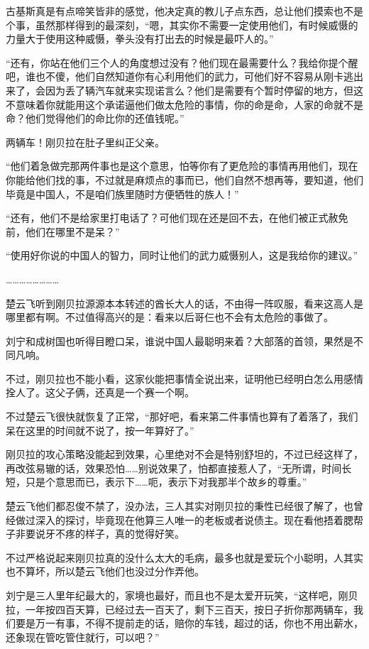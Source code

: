古基斯真是有点啼笑皆非的感觉，他决定真的教儿子点东西，总让他们摸索也不是个事，虽然那样得到的最深刻，“嗯，其实你不需要一定使用他们，有时候威慑的力量大于使用这种威慑，拳头没有打出去的时候是最吓人的。”

“还有，你站在他们三个人的角度想过没有？他们现在最需要什么？我给你提个醒吧，谁也不傻，他们自然知道你有心利用他们的武力，可他们好不容易从刚卡逃出来了，会因为丢了辆汽车就来实现诺言么？他们是需要有个暂时停留的地方，但这不意味着你就能用这个承诺逼他们做太危险的事情，你的命是命，人家的命就不是命？他们觉得他们的命比你的还值钱呢。”

两辆车！刚贝拉在肚子里纠正父亲。

“他们着急做完那两件事也是这个意思，怕等你有了更危险的事情再用他们，现在你能给他们找的事，不过就是麻烦点的事而已，他们自然不想再等，要知道，他们毕竟是中国人，不是咱们族里随时方便牺牲的族人！”

“还有，他们不是给家里打电话了？可他们现在还是回不去，在他们被正式赦免前，他们在哪里不是呆？”

“使用好你说的中国人的智力，同时让他们的武力威慑别人，这是我给你的建议。”

……………………

楚云飞听到刚贝拉源源本本转述的酋长大人的话，不由得一阵叹服，看来这高人是哪里都有啊。不过值得高兴的是：看来以后哥仨也不会有太危险的事做了。

刘宁和成树国也听得目瞪口呆，谁说中国人最聪明来着？大部落的首领，果然是不同凡响。

不过，刚贝拉也不能小看，这家伙能把事情全说出来，证明他已经明白怎么用感情拴人了。这父子俩，还真是一个赛一个啊。

不过楚云飞很快就恢复了正常，“那好吧，看来第二件事情也算有了着落了，我们呆在这里的时间就不说了，按一年算好了。”

刚贝拉的攻心策略没能起到效果，心里绝对不会是特别舒坦的，不过已经这样了，再改弦易辙的话，效果恐怕……别说效果了，怕都直接惹人了，“无所谓，时间长短，只是个意思而已，表示下……呃，表示下对我那半个故乡的尊重。”

楚云飞他们都忍俊不禁了，没办法，三人其实对刚贝拉的秉性已经很了解了，也曾经做过深入的探讨，毕竟现在他算三人唯一的老板或者说债主。现在看他捂着腮帮子非要说牙不疼的样子，真的觉得好笑。

不过严格说起来刚贝拉真的没什么太大的毛病，最多也就是爱玩个小聪明，人其实也不算坏，所以楚云飞他们也没过分作弄他。

刘宁是三人里年纪最大的，家境也最好，而且也不是太爱开玩笑，“这样吧，刚贝拉，一年按四百天算，已经过去一百天了，剩下三百天，按日子折你那两辆车，我们要是万一有事，不得不提前走的话，赔你的车钱，超过的话，你也不用出薪水，还象现在管吃管住就行，可以吧？”

